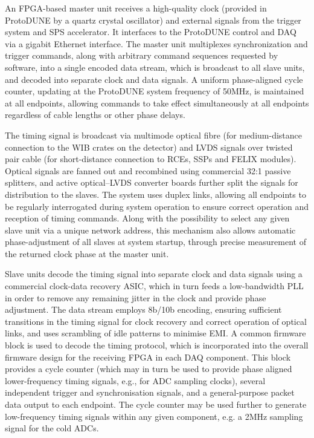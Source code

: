 An FPGA-based master unit receives a high-quality clock (provided in ProtoDUNE by a quartz crystal oscillator) and external signals from the trigger system and SPS accelerator. It interfaces to the ProtoDUNE control and DAQ via a gigabit Ethernet interface. The master unit multiplexes synchronization and trigger commands, along with arbitrary command sequences requested by software, into a single encoded data stream, which is broadcast to all slave units, and decoded into separate clock and data signals. A uniform phase-aligned cycle counter, updating at the ProtoDUNE system frequency of 50MHz, is maintained at all endpoints, allowing commands to take effect simultaneously at all endpoints regardless of cable lengths or other phase delays.

The timing signal is broadcast via multimode optical fibre (for medium-distance connection to the WIB crates on the detector) and LVDS signals over twisted pair cable (for short-distance connection to RCEs, SSPs and FELIX modules). Optical signals are fanned out and recombined using commercial 32:1 passive splitters, and active optical--LVDS converter boards further split the signals for distribution to the slaves. The system uses duplex links, allowing all endpoints to be regularly interrogated during system operation to ensure correct operation and reception of timing commands. Along with the possibility to select any given slave unit via a unique network address, this mechanism also allows automatic phase-adjustment of all slaves at system startup, through precise measurement of the returned clock phase at the master unit.

Slave units decode the timing signal into separate clock and data signals using a commercial clock-data recovery ASIC, which in turn feeds a low-bandwidth PLL in order to remove any remaining jitter in the clock and provide phase adjustment. The data stream employs 8b/10b encoding, ensuring sufficient transitions in the timing signal for clock recovery and correct operation of optical links, and uses scrambling of idle patterns to minimise EMI. A common firmware block is used to decode the timing protocol, which is incorporated into the overall firmware design for the receiving FPGA in each DAQ component. This block provides a cycle counter (which may in turn be used to provide phase aligned lower-frequency timing signals, e.g., for ADC sampling clocks), several independent trigger and synchronisation signals, and a general-purpose packet data output to each endpoint. The cycle counter may be used further to generate low-frequency timing signals within any given component, e.g. a 2MHz sampling signal for the cold ADCs.

